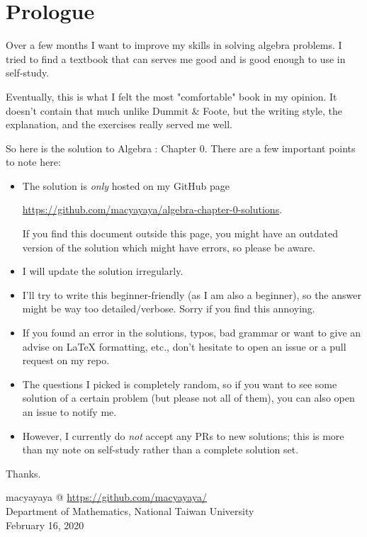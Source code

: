 \thispagestyle{empty}
\begin{center}
\end{center}
    
\newpage

\chapter{Prologue}
Over a few months I want to improve my skills in solving algebra problems. I tried to find a textbook that can serves me good and is good enough to use in self-study. 

Eventually, this is what I felt the most "comfortable" book in my opinion. It doesn't contain that much unlike Dummit \& Foote, but the writing style, the explanation, and the exercises really served me well.

So here is the solution to Algebra : Chapter 0. There are a few important points to note here:
\begin{itemize}
	\item The solution is \emph{only} hosted on my GitHub page 
	\begin{center}
		\href{https://github.com/macyayaya/algebra-chapter-0-solutions}{https://github.com/macyayaya/algebra-chapter-0-solutions}.
	\end{center} 
	If you find this document outside this page, you might have an outdated version of the solution which might have errors, so please be aware.
    \item I will update the solution irregularly.
    \item I'll try to write this beginner-friendly (as I am also a beginner), so the answer might be way too detailed/verbose. Sorry if you find this annoying. 
    \item If you found an error in the solutions, typos, bad grammar or want to give an advise on LaTeX formatting, etc., don't hesitate to open an issue or a pull request on my repo. 
    \item The questions I picked is completely random, so if you want to see some solution of a certain problem (but please not all of them), you can also open an issue to notify me. 
    \item However, I currently do \emph{not} accept any PRs to new solutions; this is more than my note on self-study rather than a complete solution set.
\end{itemize}

Thanks. 

\begin{flushright}
macyayaya @ \href{https://github.com/macyayaya/}{https://github.com/macyayaya/} \\
Department of Mathematics, National Taiwan University \\
February 16, 2020
\end{flushright}
